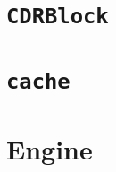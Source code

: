 \documentclass[10pt,a4paper]{article}
\begin{document}
\section{}
\makeatletter\ExplSyntaxOn
\def\CDR@Debug { \use_none:n }
\ExplSyntaxOff\makeatother

\makeatletter\ExplSyntaxOn
\def\CDR@Debug { \use_none:n }
\ExplSyntaxOff\makeatother


\section{}
\makeatletter\ExplSyntaxOn
\def\CDR@Debug { \use_none:n }
\ExplSyntaxOff\makeatother


\section{\texttt{CDRBlock}}
\makeatletter\ExplSyntaxOn
\def\CDR@Debug { \use_none:n }
\ExplSyntaxOff\makeatother


\section{\texttt{cache}}
\makeatletter\ExplSyntaxOn
\def\CDR@Debug { \use_none:n }
\ExplSyntaxOff\makeatother


\section{}
\makeatletter\ExplSyntaxOn
\def\CDR@Debug { \use_none:n }
\ExplSyntaxOff\makeatother

\makeatletter\ExplSyntaxOn
\def\CDR@Debug { \use_none:n }
\ExplSyntaxOff\makeatother


\section{Engine}
\makeatletter\ExplSyntaxOn
\def\CDR@Debug { \use_none:n }
\ExplSyntaxOff\makeatother

\end{document}
